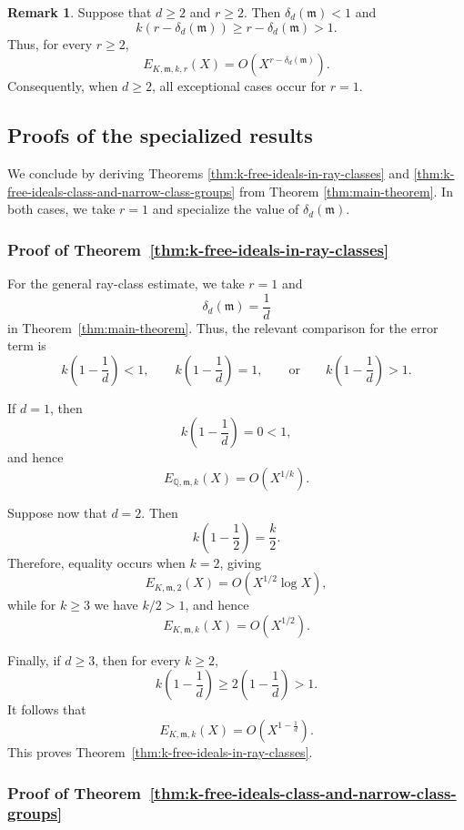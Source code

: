 \documentclass[11pt, reqno]{amsart}
\numberwithin{equation}{section}
\newcommand{\Q}{\mathbb{Q}}
\theoremstyle{definition}
\newtheorem{remark}[theorem]{Remark}
\begin{document}
\begin{remark}\label{rem:error-r-at-least-two}
Suppose that $d\geq2$ and $r\geq2$. Then
$\delta_d(\mathfrak{m})<1$ and
\[
k\left(r-\delta_d(\mathfrak{m})\right)
\geq
r-\delta_d(\mathfrak{m})
>
1.
\]
Thus, for every $r\geq2$,
\[
E_{K,\mathfrak{m},k,r}(X)
=
O\left(
X^{r-\delta_d(\mathfrak{m})}
\right).
\]
Consequently, when $d\geq2$, all exceptional cases occur for $r=1$.
\end{remark}

\subsection{Proofs of the specialized results}

We conclude by deriving
Theorems \ref{thm:k-free-ideals-in-ray-classes} and
\ref{thm:k-free-ideals-class-and-narrow-class-groups}
from Theorem \ref{thm:main-theorem}. In both cases, we take $r=1$
and specialize the value of $\delta_d(\mathfrak{m})$.

\subsubsection{Proof of Theorem~\ref{thm:k-free-ideals-in-ray-classes}}

For the general ray-class estimate, we take $r=1$ and
\[
\delta_d(\mathfrak{m})=\frac1d
\]
in Theorem~\ref{thm:main-theorem}. Thus, the relevant comparison for the error term is
\[
k\left(1-\frac1d\right)<1,\qquad
k\left(1-\frac1d\right)=1,\qquad\text{or}\qquad
k\left(1-\frac1d\right)>1.
\]

If $d=1$, then
\[
k\left(1-\frac1d\right)=0<1,
\]
and hence
\[
E_{\Q,\mathfrak{m},k}(X)=O(X^{1/k}).
\]

Suppose now that $d=2$. Then
\[
k\left(1-\frac12\right)=\frac{k}{2}.
\]
Therefore, equality occurs when $k=2$, giving
\[
E_{K,\mathfrak{m},2}(X)
=
O(X^{1/2}\log X),
\]
while for $k\geq3$ we have $k/2>1$, and hence
\[
E_{K,\mathfrak{m},k}(X)
=
O(X^{1/2}).
\]

Finally, if $d\geq3$, then for every $k\geq2$,
\[
k\left(1-\frac1d\right)
\geq
2\left(1-\frac1d\right)
>1.
\]
It follows that
\[
E_{K,\mathfrak{m},k}(X)
=
O\left(X^{1-\frac1d}\right).
\]
This proves Theorem~\ref{thm:k-free-ideals-in-ray-classes}.


\subsubsection{Proof of
Theorem~\ref{thm:k-free-ideals-class-and-narrow-class-groups}}
\end{document}
